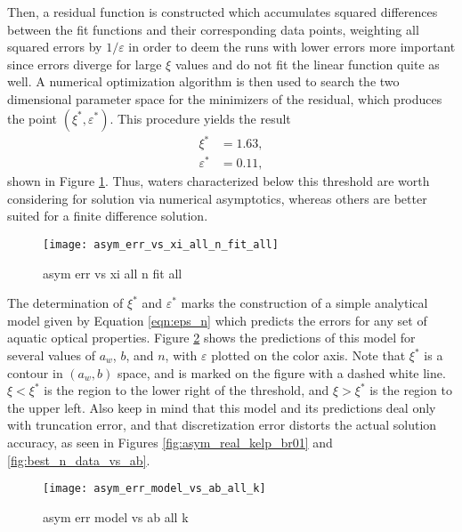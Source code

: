 Then, a residual function is constructed which accumulates squared differences between the fit functions and their corresponding data points, weighting all squared errors by $1/\varepsilon$ in order to deem the runs with lower errors more important since errors diverge for large $\xi$ values and do not fit the linear function quite as well.
A numerical optimization algorithm is then used to search the two dimensional parameter space for the minimizers of the residual, which produces the point $(\xi^*, \varepsilon^*)$.
This procedure yields the result
\begin{align}
  \xi^* &= 1.63, \\
  \varepsilon^* &= 0.11,
\end{align}
shown in Figure \ref{fig:asym_err_vs_xi_all_n_fit_all}.
Thus, waters characterized below this threshold are worth considering for solution via numerical asymptotics, whereas others are better suited for a finite difference solution.

\begin{figure}[H]
  \centering
  \texttt{[image: asym\_err\_vs\_xi\_all\_n\_fit\_all]}
  \caption{asym err vs xi all n fit all}
  \label{fig:asym_err_vs_xi_all_n_fit_all}
\end{figure}

The determination of $\xi^*$ and $\varepsilon^*$ marks the construction of a simple analytical model given by Equation \eqref{eqn:eps_n} which predicts the errors for any set of aquatic optical properties.
Figure \ref{fig:asym_err_model_vs_ab_all_k} shows the predictions of this model for several values of $a_w$, $b$, and $n$, with $\varepsilon$ plotted on the color axis.
Note that $\xi^*$ is a contour in $(a_w, b)$ space, and is marked on the figure with a dashed white line.
$\xi<\xi^*$ is the region to the lower right of the threshold, and $\xi>\xi^*$ is the region to the upper left.
Also keep in mind that this model and its predictions deal only with truncation error, and that discretization error distorts the actual solution accuracy, as seen in Figures \ref{fig:asym_real_kelp_br01} and \ref{fig:best_n_data_vs_ab}.

\begin{figure}[H]
  \centering
  \texttt{[image: asym\_err\_model\_vs\_ab\_all\_k]}
  \caption{asym err model vs ab all k}
  \label{fig:asym_err_model_vs_ab_all_k}
\end{figure}

